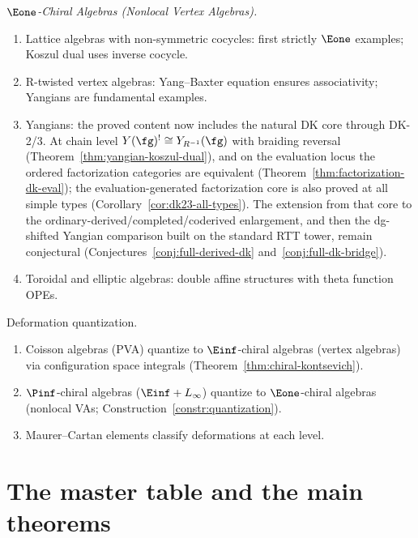 \emph{$\Eone$-Chiral Algebras (Nonlocal Vertex Algebras).}
\begin{enumerate}[label=(\roman*)]
\item Lattice algebras with non-symmetric cocycles: first strictly $\Eone$ examples;
Koszul dual uses inverse cocycle.
\item R-twisted vertex algebras: Yang--Baxter equation ensures associativity;
Yangians are fundamental examples.
\item Yangians: the proved content now includes the natural DK core
  through DK-2/3.  At chain level
  $Y(\fg)^! \cong Y_{R^{-1}}(\fg)$ with braiding reversal
  \textup{(}Theorem~\ref{thm:yangian-koszul-dual}\textup{)}, and on the
  evaluation locus the ordered factorization categories are equivalent
  \textup{(}Theorem~\ref{thm:factorization-dk-eval}\textup{)}; the
  evaluation-generated factorization core is also proved at all simple
  types \textup{(}Corollary~\ref{cor:dk23-all-types}\textup{)}.  The
  extension from that core to the
  ordinary-derived/completed/coderived enlargement, and then the
  dg-shifted Yangian comparison built on the standard RTT tower,
  remain conjectural
  \textup{(}Conjectures~\ref{conj:full-derived-dk}
  and~\ref{conj:full-dk-bridge}\textup{)}.
\item Toroidal and elliptic algebras: double affine structures with theta function OPEs.
\end{enumerate}

Deformation quantization.
\begin{enumerate}[label=(\roman*)]
\item Coisson algebras (PVA) quantize to $\Einf$-chiral algebras (vertex algebras)
via configuration space integrals (Theorem~\ref{thm:chiral-kontsevich}).
\item $\Pinf$-chiral algebras ($\Einf + L_\infty$) quantize to $\Eone$-chiral
algebras (nonlocal VAs; Construction~\ref{constr:quantization}).
\item Maurer--Cartan elements classify deformations at each level.
\end{enumerate}

\section*{The master table and the main theorems}

